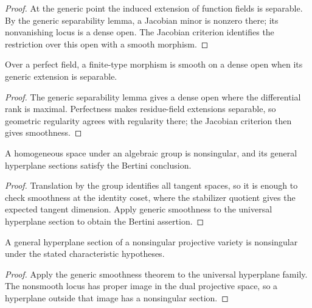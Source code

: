 \begin{proof}

At the generic point the induced extension of function fields is separable.  By the generic
separability lemma, a Jacobian minor is nonzero there; its nonvanishing locus is a dense open.  The
Jacobian criterion identifies the restriction over this open with a smooth morphism.

\end{proof}
\begin{corollary}\label{ha-ch3-cor-bertini}
Over a perfect field, a finite-type morphism is smooth on a dense open when its
generic extension is separable.

\end{corollary}
\begin{proof}

The generic separability lemma gives a dense open where the differential rank is maximal.  Perfectness
 makes residue-field extensions separable, so geometric regularity agrees with regularity there; the
 Jacobian criterion then gives smoothness.

\end{proof}
\begin{theorem}\label{ha-ch3-thm-homogeneous}
A homogeneous space under an algebraic group is nonsingular, and its general
hyperplane sections satisfy the Bertini conclusion.

\end{theorem}
\begin{proof}

Translation by the group identifies all tangent spaces, so it is enough to check smoothness at the
identity coset, where the stabilizer quotient gives the expected tangent dimension.  Apply generic
smoothness to the universal hyperplane section to obtain the Bertini assertion.

\end{proof}
\begin{corollary}\label{ha-ch3-cor-bertini-section}
A general hyperplane section of a nonsingular projective variety is
nonsingular under the stated characteristic hypotheses.

\end{corollary}
\begin{proof}

Apply the generic smoothness theorem to the universal hyperplane family.  The nonsmooth locus has
 proper image in the dual projective space, so a hyperplane outside that image has a nonsingular
 section.

\end{proof}

